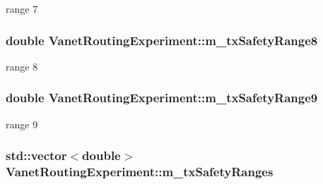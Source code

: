 range 7 

\subsubsection[{\texorpdfstring{m\+\_\+tx\+Safety\+Range8}{m_txSafetyRange8}}]{\setlength{\rightskip}{0pt plus 5cm}double Vanet\+Routing\+Experiment\+::m\+\_\+tx\+Safety\+Range8\hspace{0.3cm}{\ttfamily [private]}}\hypertarget{classVanetRoutingExperiment_a264dfa5219cb2bf6535743fc2906f8b1}{}\label{classVanetRoutingExperiment_a264dfa5219cb2bf6535743fc2906f8b1}


range 8 

\subsubsection[{\texorpdfstring{m\+\_\+tx\+Safety\+Range9}{m_txSafetyRange9}}]{\setlength{\rightskip}{0pt plus 5cm}double Vanet\+Routing\+Experiment\+::m\+\_\+tx\+Safety\+Range9\hspace{0.3cm}{\ttfamily [private]}}\hypertarget{classVanetRoutingExperiment_ad2675092fe212a15aa1f0b60fb2bea8d}{}\label{classVanetRoutingExperiment_ad2675092fe212a15aa1f0b60fb2bea8d}


range 9 

\subsubsection[{\texorpdfstring{m\+\_\+tx\+Safety\+Ranges}{m_txSafetyRanges}}]{\setlength{\rightskip}{0pt plus 5cm}std\+::vector$<$double$>$ Vanet\+Routing\+Experiment\+::m\+\_\+tx\+Safety\+Ranges\hspace{0.3cm}{\ttfamily [private]}}\hypertarget{classVanetRoutingExperiment_a6cd05046b2e71e266ee72b0d31f8dcc9}{}\label{classVanetRoutingExperiment_a6cd05046b2e71e266ee72b0d31f8dcc9}


